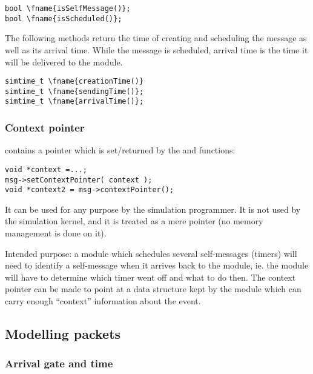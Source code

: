 \begin{Verbatim}[commandchars=\\\{\}]
bool \fname{isSelfMessage()};
bool \fname{isScheduled()};
\end{Verbatim}

The following methods return the time of creating and scheduling the message
as well as its arrival time. While the message is scheduled, arrival
time is the time it will be delivered to the module.

\begin{Verbatim}[commandchars=\\\{\}]
simtime_t \fname{creationTime()}
simtime_t \fname{sendingTime()};
simtime_t \fname{arrivalTime()};
\end{Verbatim}

\subsubsection{Context pointer}

 contains a  pointer which is
set/returned by the  and
 functions:

\begin{verbatim}
void *context =...;
msg->setContextPointer( context );
void *context2 = msg->contextPointer();
\end{verbatim}


It can be used for any purpose by the simulation programmer.
It is not used by the simulation kernel, and it is treated as
a mere pointer (no memory management is done on it).

Intended purpose: a module which schedules several self-messages
(timers) will need to identify a self-message when it arrives back to
the module, ie. the module will have to determine which timer went off
and what to do then. The context pointer can be
made to point at a data structure kept by the module which can carry
enough ``context'' information about the event.



\subsection{Modelling packets}

\subsubsection{Arrival gate and time}

